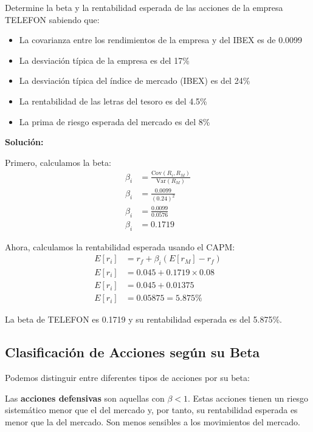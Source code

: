 \begin{ejemplo}
Determine la beta y la rentabilidad esperada de las acciones de la empresa TELEFON sabiendo que:
\begin{itemize}
\item La covarianza entre los rendimientos de la empresa y del IBEX es de 0.0099
\item La desviación típica de la empresa es del 17\%
\item La desviación típica del índice de mercado (IBEX) es del 24\%
\item La rentabilidad de las letras del tesoro es del 4.5\%
\item La prima de riesgo esperada del mercado es del 8\%
\end{itemize}

\textbf{Solución:}

Primero, calculamos la beta:
\begin{align}
\beta_i &= \frac{\text{Cov}(R_i, R_M)}{\text{Var}(R_M)} \\
\beta_i &= \frac{0.0099}{(0.24)^2} \\
\beta_i &= \frac{0.0099}{0.0576} \\
\beta_i &= 0.1719
\end{align}

Ahora, calculamos la rentabilidad esperada usando el CAPM:
\begin{align}
E[r_i] &= r_f + \beta_i(E[r_M] - r_f) \\
E[r_i] &= 0.045 + 0.1719 \times 0.08 \\
E[r_i] &= 0.045 + 0.01375 \\
E[r_i] &= 0.05875 = 5.875\%
\end{align}

La beta de TELEFON es 0.1719 y su rentabilidad esperada es del 5.875\%.
\end{ejemplo}

\subsection{Clasificación de Acciones según su Beta}

Podemos distinguir entre diferentes tipos de acciones por su beta:

\begin{definicion}
Las \textbf{acciones defensivas} son aquellas con $\beta < 1$. Estas acciones tienen un riesgo sistemático menor que el del mercado y, por tanto, su rentabilidad esperada es menor que la del mercado. Son menos sensibles a los movimientos del mercado.
\end{definicion}

